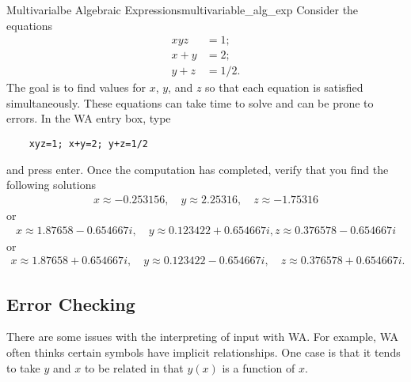 \begin{ex}{Multivarialbe Algebraic Expressions}{multivariable_alg_exp}
Consider the equations
\begin{align*}
    xyz&=1;\\
    x+y&=2;\\
    y+z&=1/2.
\end{align*}
The goal is to find values for $x$, $y$, and $z$ so that each equation is satisfied simultaneously.  These equations can take time to solve and can be prone to errors.  In the WA entry box, type

\begin{center}
    \begin{BVerbatim}
    xyz=1; x+y=2; y+z=1/2
    \end{BVerbatim}
\end{center}

and press enter.  Once the computation has completed, verify that you find the following solutions
\begin{align*}
    x\approx-0.253156,\quad y\approx2.25316,\quad z\approx-1.75316
\end{align*}
or
\begin{align*}
    x\approx1.87658 - 0.654667 i,\quad y\approx0.123422 + 0.654667 i, z\approx0.376578 - 0.654667 i
\end{align*}
or
\begin{align*}
    x\approx1.87658 + 0.654667 i,\quad y\approx0.123422 - 0.654667 i,\quad z\approx0.376578 + 0.654667 i.
\end{align*}
\end{ex}

\subsection{Error Checking}
There are some issues with the interpreting of input with WA.  For example, WA often thinks certain symbols have implicit relationships.  One case is that it tends to take $y$ and $x$ to be related in that $y(x)$ is a function of $x$.



%

